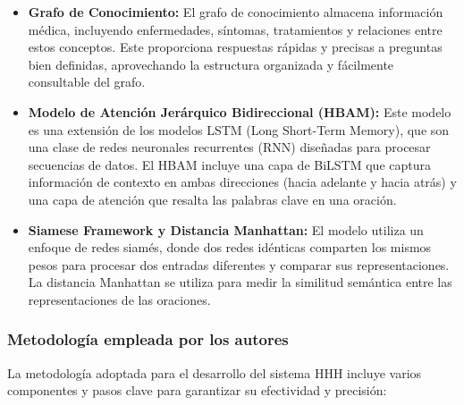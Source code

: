 		\begin{itemize}
			\item \textbf{ Grafo de Conocimiento:} El grafo de conocimiento almacena información médica, incluyendo enfermedades, síntomas, tratamientos y relaciones entre estos conceptos. Este proporciona respuestas rápidas y precisas a preguntas bien definidas, aprovechando la estructura organizada y fácilmente consultable del grafo.
		
			\item \textbf{Modelo de Atención Jerárquico Bidireccional (HBAM):} Este modelo es una extensión de los modelos LSTM (Long Short-Term Memory), que son una clase de redes neuronales recurrentes (RNN) diseñadas para procesar secuencias de datos. El HBAM incluye una capa de BiLSTM que captura información de contexto en ambas direcciones (hacia adelante y hacia atrás) y una capa de atención que resalta las palabras clave en una oración.
		
			\item \textbf{Siamese Framework y Distancia Manhattan:} El modelo utiliza un enfoque de redes siamés, donde dos redes idénticas comparten los mismos pesos para procesar dos entradas diferentes y comparar sus representaciones. La distancia Manhattan se utiliza para medir la similitud semántica entre las representaciones de las oraciones.
		\end{itemize}
		

\subsubsection{Metodología empleada por los autores}
La metodología adoptada para el desarrollo del sistema HHH incluye varios componentes y pasos clave para garantizar su efectividad y precisión:

